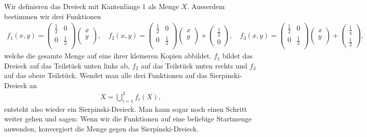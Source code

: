 Wir definieren das Dreieck mit Kantenlänge 1 als Menge $X$.
Ausserdem bestimmen wir drei Funktionen
\begin{align*}
	f_1(x,y)
	= 
	\begin{pmatrix}
		\frac{1}{2} & 0 \\
		0 & \frac{1}{2} \\
	\end{pmatrix}
	\begin{pmatrix}
		x\\
		y\\
	\end{pmatrix} 
	,\quad
	f_2(x,y)
	= 
	\begin{pmatrix}
		\frac{1}{2} & 0 \\
		0 & \frac{1}{2} \\
	\end{pmatrix}
	\begin{pmatrix}
		x\\
		y\\
	\end{pmatrix} 
	+
	\begin{pmatrix}
		\frac{1}{2} \\
		0
	\end{pmatrix}
	, \quad
	f_3(x,y)
	= 
	\begin{pmatrix}
		\frac{1}{2} & 0 \\
		0 & \frac{1}{2} \\
	\end{pmatrix}
	\begin{pmatrix}
		x\\
		y\\
	\end{pmatrix} 
	+
	\begin{pmatrix}
		\frac{1}{4} \\
		\frac{1}{2}
	\end{pmatrix},
\end{align*}
welche die gesamte Menge auf eine ihrer kleineren Kopien abbildet.
$f_1$ bildet das Dreieck auf das Teilstück unten links ab, $f_2$ auf das Teilstück unten rechts und $f_3$ auf das obere Teilstück.
Wendet man alle drei Funktionen auf das Sierpinski-Dreieck an
\begin{align*}
	X = \bigcup\limits_{i = 1}^{3} f_i(X),
\end{align*}
entsteht also wieder ein Sierpinski-Dreieck.
Man kann sogar noch einen Schritt weiter gehen und sagen: Wenn wir die Funktionen auf eine beliebige Startmenge anwenden, konvergiert die Menge gegen das Sierpinski-Dreieck.
